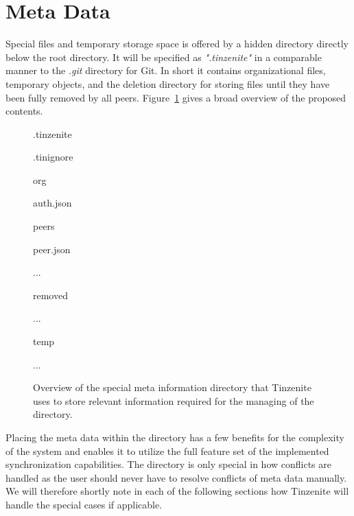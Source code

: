 \section{Meta Data}
\label{sec:Meta Data}

Special files and temporary storage space is offered by a hidden directory directly below the root directory.
It will be specified as \textit{".tinzenite"} in a comparable manner to the \textit{.git} directory for Git.
In short it contains organizational files, temporary objects, and the deletion directory for storing files until they have been fully removed by all peers.
Figure~\ref{list:meta_folder} gives a broad overview of the proposed contents.

\begin{figure}[htp]
\begin{modellist}
\item .tinzenite
\begin{modellist}
    \item .tinignore
    \item org
    \begin{modellist}
        \item auth.json
        \item peers
        \begin{modellist}
            \item peer.json
            \item ...
        \end{modellist}
    \end{modellist}
    \item removed
    \begin{modellist}
        \item ...
    \end{modellist}
    \item temp
    \begin{modellist}
        \item ...
    \end{modellist}
\end{modellist}
\end{modellist}
\caption[Meta Folder Structure]{Overview of the special meta information directory that Tinzenite uses to store relevant information required for the managing of the directory.}
\label{list:meta_folder}
\end{figure}

Placing the meta data within the directory has a few benefits for the complexity of the system and enables it to utilize the full feature set of the implemented synchronization capabilities.
The directory is only special in how conflicts are handled as the user should never have to resolve conflicts of meta data manually.
We will therefore shortly note in each of the following sections how Tinzenite will handle the special cases if applicable.

